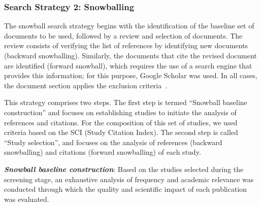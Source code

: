\subsubsection{Search Strategy 2: Snowballing}

\newcommand{\csiSelected}{24} %
\newcommand{\newSnowballStudies}{3} %
\newcommand{\firstBackwardSnowballStudies}{3} %
\newcommand{\firstForwardSnowballStudies}{4} %
\newcommand{\secondBackwardSnowballStudies}{3} %
\newcommand{\secondForwardSnowballStudies}{5} %

\newcommand{\firstSnowballIterationStudies}{\fpeval{\firstBackwardSnowballStudies+\firstForwardSnowballStudies}}
\newcommand{\secondSnowballIterationStudies}{\fpeval{\secondBackwardSnowballStudies+\secondForwardSnowballStudies}}

\newcommand{\snowballNewStudies}{\fpeval{\firstSnowballIterationStudies+\secondSnowballIterationStudies}}

The snowball search strategy begins with the identification of the baseline set of documents to be used, followed by a review and selection of documents. The review consists of verifying the list of references by identifying new documents (backward snowballing). Similarly, the documents that cite the revised document are identified (forward snowball), which requires the use of a search engine that provides this information; for this purpose, Google Scholar was used. In all cases, the document section applies the exclusion criteria~\cite{Wohlin-01}.

This strategy comprises two steps. The first step is termed ``Snowball baseline construction'' and focuses on establishing studies to initiate the analysis of references and citations. For the composition of this set of studies, we used criteria based on the SCI (Study Citation Index). The second step is called ``Study selection'', and focuses on the analysis of references (backward snowballing) and citations (forward snowballing) of each study.

\textit{\textbf{Snowball baseline construction}}: Based on the \screenTot{} studies selected during the screening stage, an exhaustive analysis of frequency and academic relevance was conducted through which the quality and scientific impact of each publication was evaluated.

